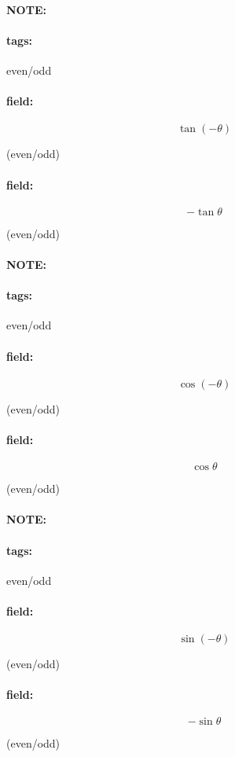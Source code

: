 \documentclass[12pt]{article}
\newenvironment{note}{\paragraph{NOTE:}}{}
\newenvironment{field}{\paragraph{field:}}{}
\newcommand*{\tags}[1]{\paragraph{tags: }#1}
\begin{document}
\begin{note}
    \tags{even/odd}
    \begin{field}
    \[  
        \tan(-\theta)
    \] 
    \begin{center}
    (even/odd)
    \end{center}
    \end{field}
    \begin{field}
    \[
        -\tan \theta
    \] 
    \begin{center}
    (even/odd)
    \end{center}
    \end{field}
\end{note}

\begin{note}
    \tags{even/odd}
    \begin{field}
    \[  
        \cos(-\theta)
    \] 
    \begin{center}
    (even/odd)
    \end{center}
    \end{field}
    \begin{field}
    \[
        \cos \theta
    \] 
    \begin{center}
    (even/odd)
    \end{center}
    \end{field}
\end{note}

\begin{note}
    \tags{even/odd}
    \begin{field}
    \[  
        \sin(-\theta)
    \] 
    \begin{center}
    (even/odd)
    \end{center}
    \end{field}
    \begin{field}
    \[
        - \sin \theta
    \] 
    \begin{center}
    (even/odd)
    \end{center}
    \end{field}
\end{note}
\end{document}
